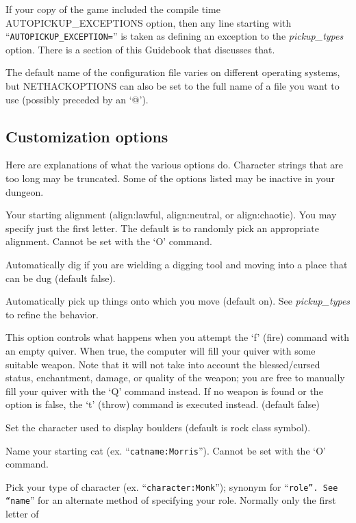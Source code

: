 If your copy of the game included the compile time AUTOPICKUP\_EXCEPTIONS
option, then any line starting with ``{\tt AUTOPICKUP\_EXCEPTION=}'' is taken
as defining an exception to the 
{\it pickup\_types }
option. 
There is a section of this Guidebook that discusses that.

The default name of the configuration file varies on different
operating systems, but NETHACKOPTIONS can also be set to
the full name of a file you want to use (possibly preceded by an `@').
\subsection*{Customization options}

Here are explanations of what the various options do.
Character strings that are too long may be truncated.
Some of the options listed may be inactive in your dungeon.
\blist{}
\item[\tb{align}]
Your starting alignment (align:lawful, align:neutral,
or align:chaotic).  You may specify just the first letter.
The default is to randomly pick an appropriate alignment.
Cannot be set with the `O' command.
\item[\tb{autodig}]
Automatically dig if you are wielding a digging tool and moving into a place
that can be dug (default false).
\item[\tb{"autopickup  "}]
Automatically pick up things onto which you move (default on). 
See
{\it pickup\_types }
to refine the behavior.
\item[\tb{"autoquiver  "}]
This option controls what happens when you attempt the `f' (fire)
command with an empty quiver.  When true, the computer will fill
your quiver with some suitable weapon.  Note that it will not take
into account the blessed/cursed status, enchantment, damage, or
quality of the weapon; you are free to manually fill your quiver with
the `Q' command instead.  If no weapon is found or the option is
false, the `t' (throw) command is executed instead.  (default false)
\item[\tb{boulder}]
Set the character used to display boulders (default is rock class symbol).
\item[\tb{catname}]
Name your starting cat (ex. ``{\tt catname:Morris}'').
Cannot be set with the `O' command.
\item[\tb{character}]
Pick your type of character (ex. ``{\tt character:Monk}'');
synonym for ``{\tt role''.  See ``name}'' for an alternate method
of specifying your role.  Normally only the first letter of
